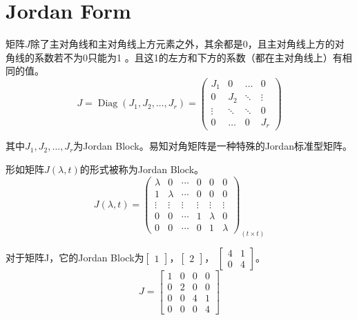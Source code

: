\documentclass[lang=cn,10pt]{elegantbook}
\begin{document}
\section{Jordan Form}
\begin{definition}
	矩阵$J$除了主对角线和主对角线上方元素之外，其余都是0，且主对角线上方的对角线的系数若不为0只能为1
	。且这1的左方和下方的系数（都在主对角线上）有相同的值。
	\begin{equation}
		J=\operatorname{Diag}(J_1,J_2,\ldots,J_r)=
		\left(\begin{array}{cccc}
				\boxed{J_1} & 0           & \ldots & 0           \\
				0           & \boxed{J_2} & \ddots & \vdots      \\
				\vdots      & \ddots      & \ddots & 0           \\
				0           & \ldots      & 0      & \boxed{J_r}
			\end{array}\right)
	\end{equation}
	\par 其中$J_1,J_2,\ldots,J_r$为Jordan Block。易知对角矩阵是一种特殊的Jordan标准型矩阵。
\end{definition}
\begin{definition}
	形如矩阵$J\left(\lambda,t\right)$的形式被称为Jordan Block。
	\begin{equation}
		J\left(\lambda,t\right)=
		\begin{pmatrix}
			\lambda & 0       & \cdots & 0      & 0       & 0       \\
			1       & \lambda & \cdots & 0      & 0       & 0       \\
			\vdots  & \vdots  & \vdots & \vdots & \vdots  & \vdots  \\
			0       & 0       & \cdots & 1      & \lambda & 0       \\
			0       & 0       & \cdots & 0      & 1       & \lambda
		\end{pmatrix}_{(t\times t)}
	\end{equation}
\end{definition}
\begin{example}
	对于矩阵J，它的Jordan Block为$\begin{bmatrix} 1 \end{bmatrix}$，$\begin{bmatrix} 2 \end{bmatrix}$，
	$\begin{bmatrix} 4&1\\0&4\end{bmatrix}$。
	\begin{equation*}
		J=
		\begin{bmatrix}
			1 & 0 & 0 & 0 \\
			0 & 2 & 0 & 0 \\
			0 & 0 & 4 & 1 \\
			0 & 0 & 0 & 4
		\end{bmatrix}
	\end{equation*}
\end{example}
\end{document}
